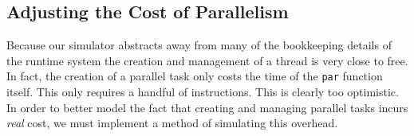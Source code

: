 \subsection{Adjusting the Cost of Parallelism}

Because our simulator abstracts away from many of the bookkeeping details of
the runtime system the creation and management of a thread is very close to
free. In fact, the creation of a parallel task only costs the time of the
\verb|par| function itself. This only requires a handful of instructions.  This
is clearly too optimistic. In order to better model the fact that creating and
managing parallel tasks incurs \emph{real} cost, we must implement a method of
simulating this overhead.
